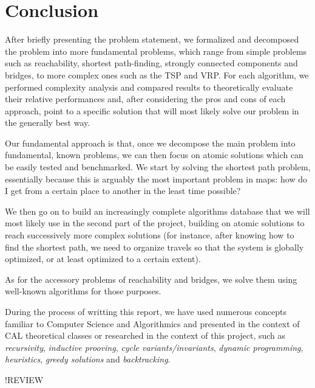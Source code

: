 \chapter{Conclusion} \label{conclusion}
After briefly presenting the problem statement, we formalized and decomposed the problem into more fundamental problems, which range from simple problems such as reachability, shortest path-finding, strongly connected components and bridges, to more complex ones such as the \ac{TSP} and \ac{VRP}. For each algorithm, we performed complexity analysis and compared results to theoretically evaluate their relative performances and, after considering the pros and cons of each approach, point to a specific solution that will most likely solve our problem in the generally best way.\par
Our fundamental approach is that, once we decompose the main problem into fundamental, known problems, we can then focus on atomic solutions which can be easily tested and benchmarked. We start by solving the shortest path problem, essentially because this is arguably the most important problem in maps: how do I get from a certain place to another in the least time possible?\par
We then go on to build an increasingly complete algorithms database that we will most likely use in the second part of the project, building on atomic solutions to reach successively more complex solutions (for instance, after knowing how to find the shortest path, we need to organize travels so that the system is globally optimized, or at least optimized to a certain extent).\par
As for the accessory problems of reachability and bridges, we solve them using well-known algorithms for those purposes.\par
During the process of writting this report, we have used numerous concepts familiar to Computer Science and Algorithmics and presented in the context of CAL theoretical classes or researched in the context of this project, such as \emph{recursivity}, \emph{inductive prooving}, \emph{cycle variants/invariants}, \emph{dynamic programming}, \emph{heuristics}, \emph{greedy solutions} and \emph{backtracking}.\par
!REVIEW
